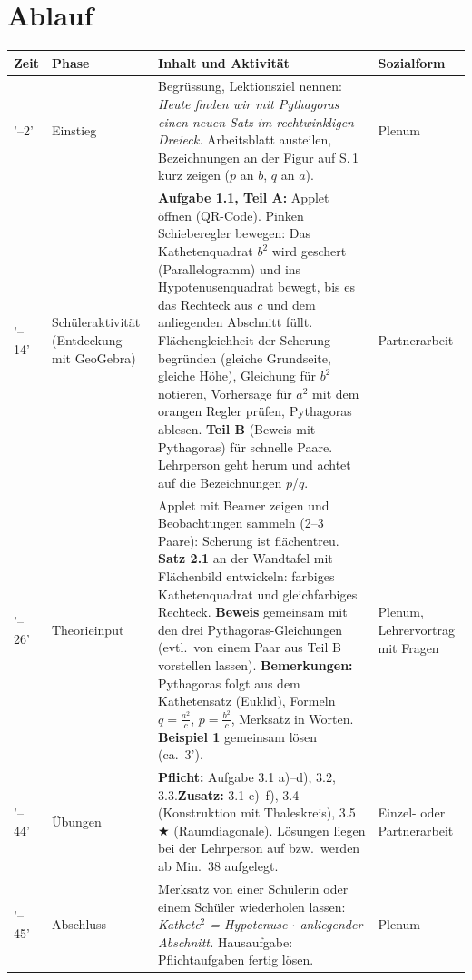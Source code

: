 \documentclass[11pt,oneside]{article}
\begin{document}
\section*{Ablauf}
\renewcommand{\arraystretch}{1.3}
\begin{tabularx}{\textwidth}{|>{\raggedright\arraybackslash}p{11mm}|>{\raggedright\arraybackslash}p{27mm}|X|>{\raggedright\arraybackslash}p{22mm}|}\hline
	\textbf{Zeit} & \textbf{Phase} & \textbf{Inhalt und Aktivität} & \textbf{Sozialform}\\\hline
	0'--2' & Einstieg & Begrüssung, Lektionsziel nennen: \textit{Heute finden wir mit Pythagoras einen neuen Satz im rechtwinkligen Dreieck.} Arbeitsblatt austeilen, Bezeichnungen an der Figur auf S.\,1 kurz zeigen ($p$ an $b$, $q$ an $a$). & Plenum\\\hline
	2'--14' & Schüleraktivität (Entdeckung mit GeoGebra) & \textbf{Aufgabe 1.1, Teil A:} Applet öffnen (QR-Code). Pinken Schieberegler bewegen: Das Kathetenquadrat $b^2$ wird geschert (Parallelogramm) und ins Hypotenusenquadrat bewegt, bis es das Rechteck aus $c$ und dem anliegenden Abschnitt füllt. Flächengleichheit der Scherung begründen (gleiche Grundseite, gleiche Höhe), Gleichung für $b^2$ notieren, Vorhersage für $a^2$ mit dem orangen Regler prüfen, Pythagoras ablesen. \textbf{Teil B} (Beweis mit Pythagoras) für schnelle Paare. Lehrperson geht herum und achtet auf die Bezeichnungen $p$/$q$. & Partnerarbeit\\\hline
	14'--26' & Theorieinput & Applet mit Beamer zeigen und Beobachtungen sammeln (2--3 Paare): Scherung ist flächentreu. \textbf{Satz 2.1} an der Wandtafel mit Flächenbild entwickeln: farbiges Kathetenquadrat und gleichfarbiges Rechteck. \textbf{Beweis} gemeinsam mit den drei Pythagoras-Gleichungen (evtl.\ von einem Paar aus Teil B vorstellen lassen). \textbf{Bemerkungen:} Pythagoras folgt aus dem Kathetensatz (Euklid), Formeln $q=\frac{a^2}{c}$, $p=\frac{b^2}{c}$, Merksatz in Worten. \textbf{Beispiel 1} gemeinsam lösen (ca.\ 3'). & Plenum, Lehrervortrag mit Fragen\\\hline
	26'--44' & Übungen & \textbf{Pflicht:} Aufgabe 3.1 a)--d), 3.2, 3.3.\newline \textbf{Zusatz:} 3.1 e)--f), 3.4 (Konstruktion mit Thaleskreis), 3.5 $\bigstar$ (Raumdiagonale). Lösungen liegen bei der Lehrperson auf bzw.\ werden ab Min.\ 38 aufgelegt. & Einzel- oder Partnerarbeit\\\hline
	44'--45' & Abschluss & Merksatz von einer Schülerin oder einem Schüler wiederholen lassen: \textit{Kathete$^2$ = Hypotenuse $\cdot$ anliegender Abschnitt.} Hausaufgabe: Pflichtaufgaben fertig lösen. & Plenum\\\hline
\end{tabularx}
\end{document}

